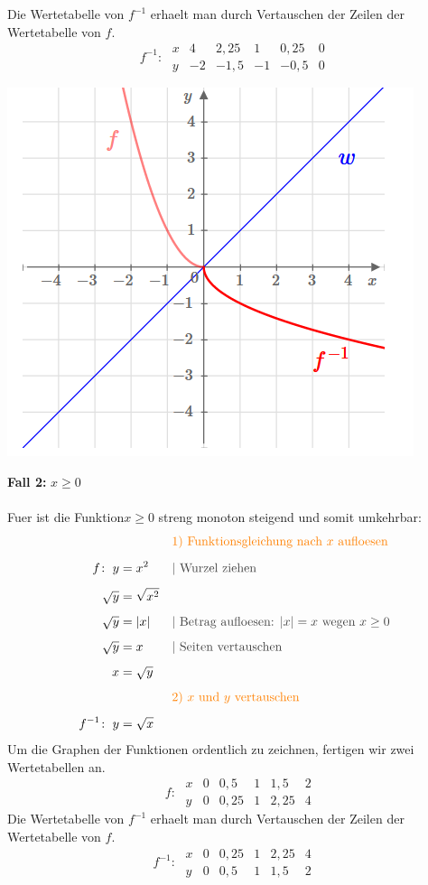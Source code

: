 \begin{multicols}{2}
    Die Wertetabelle von $f^{-1}$ erhaelt man durch Vertauschen der Zeilen der Wertetabelle von $f$.
    \[f^{-1}\colon\; \begin{array}{r|c|c|c|c|c} x & 4 & 2{,}25 & 1 & 0{,}25 & 0 \\ \hline y & -2 & -1{,}5 & -1 & -0{,}5 & 0 \end{array}\]
    \begin{center}
        \includegraphics[scale=0.7]{wurzelfunktion1}
    \end{center}
    \textbf{Fall 2:} $x \geq 0$\\~\\
    Fuer ist die Funktion$x \geq 0$ streng monoton steigend und somit umkehrbar:
    \begin{align*} & &&{\color{orange}\text{1) Funktionsgleichung nach $x$ aufloesen}} \\[5px] f\colon\; y &= x^2 &&{\color{darkgray}| \text{ Wurzel ziehen}} \\[5px] \sqrt{y} &= \sqrt{x^2} \\[5px] \sqrt{y} &= |x| &&{\color{darkgray}| \text{ Betrag aufloesen: } |x| = x \text{ wegen } x \geq 0} \\[5px] \sqrt{y} &= x &&{\color{darkgray}| \text{ Seiten vertauschen}} \\[5px] x &= \sqrt{y} \\[5px] & &&{\color{orange}\text{2) $x$ und $y$ vertauschen}} \\[5px] f^{-1}\colon\; y &= \sqrt{x} \end{align*}
    Um die Graphen der Funktionen ordentlich zu zeichnen, fertigen wir zwei Wertetabellen an.
    \[\phantom{^{-1}}f\colon\; \begin{array}{r|c|c|c|c|c} x & 0 & 0{,}5 & 1 & 1{,}5 & 2 \\ \hline y & 0 & 0{,}25 & 1 & 2{,}25 & 4 \end{array}\]
    Die Wertetabelle von $f^{-1}$ erhaelt man durch Vertauschen der Zeilen der Wertetabelle von $f$.
    \[f^{-1}\colon\; \begin{array}{r|c|c|c|c|c} x & 0 & 0{,}25 & 1 & 2{,}25 & 4 \\ \hline y & 0 & 0{,}5 & 1 & 1{,}5 & 2 \end{array}\]


\end{multicols}
